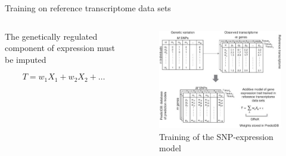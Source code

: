 \documentclass[aspectratio=169,12pt]{beamer}
\begin{document}
\begin{frame}{Training on reference transcriptome data sets}
	
	\begin{columns}
		\begin{column}{0.4\textwidth}
			The genetically regulated component of expression must be 
imputed

			\begin{equation*}
				T = w_1 X_1 + w_2 X_2 + \ldots
			\end{equation*}
		\end{column}

		\begin{column}{0.6\textwidth}
			\begin{figure}
				\includegraphics[width=\textwidth]{gamazon2015/2-grex_estimation_part1}
				\caption{Training of the SNP-expression model}
			\end{figure}
		\end{column}
	\end{columns}


\end{frame}
\end{document}
